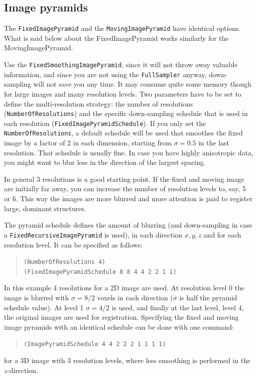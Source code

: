 \documentclass[]{report}
\begin{document}
\subsection{Image pyramids}\label{sec:pyramidtuning}

The \texttt{FixedImagePyramid} and the \texttt{MovingImagePyramid}
have identical options. What is said below about the
FixedImagePyramid works similarly for the MovingImagePyramid.

Use the \texttt{FixedSmoothingImagePyramid}, since it will not throw
away valuable information, and since you are not using the
\texttt{FullSampler} anyway, down-sampling will not save you any
time. It may consume quite some memory though for large images and
many resolution levels. Two parameters have to be set to define the
multi-resolution strategy: the number of resolutions
(\texttt{NumberOfResolutions}) and the specific down-sampling
schedule that is used in each resolution
(\texttt{FixedImagePyramidSchedule}). If you only set the
\texttt{NumberOfResolutions}, a default schedule will be used that
smoothes the fixed image by a factor of 2 in each dimension,
starting from $\sigma = 0.5$ in the last resolution. That schedule
is usually fine. In case you have highly anisotropic data, you might
want to blur less in the direction of the largest spacing.

In general 3 resolutions is a good starting point. If the fixed and
moving image are initially far away, you can increase the number of
resolution levels to, say, 5 or 6. This way the images are more
blurred and more attention is paid to register large, dominant
structures.

The pyramid schedule defines the amount of blurring (and
down-sampling in case a \texttt{FixedRecursiveImagePyramid} is used),
in each direction $x,y,z$ and for each resolution level. It can be
specified as follows:
\begin{quote}
\texttt{(NumberOfResolutions 4)} \\
\texttt{(FixedImagePyramidSchedule 8 8 4 4 2 2 1 1)}
\end{quote}
In this example 4 resolutions for a 2D image are used. At
resolution level 0 the image is blurred with $\sigma = 8/2$ voxels
in each direction ($\sigma$ is half the pyramid schedule value).
At level 1 $\sigma = 4/2$ is used, and finally at the last level,
level 4, the original images are used for registration. Specifying
the fixed and moving image pyramids with an identical schedule can
be done with one command:
\begin{quote}
\texttt{(ImagePyramidSchedule 4 4 2 2 2 1 1 1 1)}
\end{quote}
for a 3D image with 3 resolution levels, where less smoothing is
performed in the $z$-direction.
\end{document}
